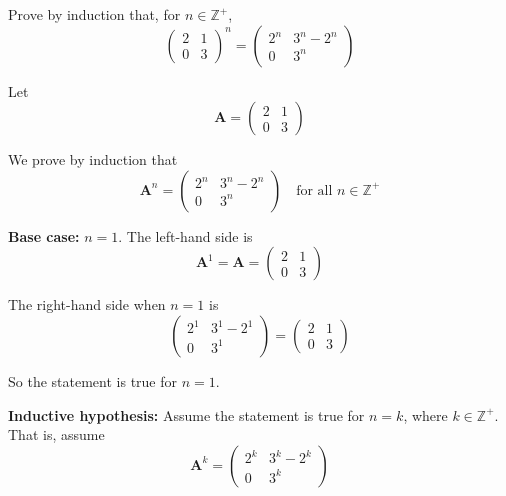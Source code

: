 \documentclass[leqno]{article}
\begin{document}
\djsFrontMatter
\begin{enumerate}[
  label=\textbf{\arabic*.},
  leftmargin=*,
  topsep=0pt,
  partopsep=0pt,
  parsep=0pt
]

\questionitem

Prove by induction that, for $n \in \mathbb{Z}^+$,
\[
\renewcommand{\arraystretch}{1.2}
\begin{pmatrix} 2 & 1 \\ 0 & 3 \end{pmatrix}^n = \begin{pmatrix} 2^n & 3^n - 2^n \\ 0 & 3^n \end{pmatrix}
\]

\vspace*{10pt}

\begin{djsSolution}
Let
\[
\mathbf{A}=\begin{pmatrix}2&1\\0&3\end{pmatrix}
\]

We prove by induction that
\[
\mathbf{A}^n=\begin{pmatrix}2^n&3^n-2^n\\0&3^n\end{pmatrix}\quad\text{for all }n\in\mathbb{Z}^+
\]

\textbf{Base case:} $n=1$. The left-hand side is
\[
\mathbf{A}^1=\mathbf{A}=\begin{pmatrix}2&1\\0&3\end{pmatrix}
\]

The right-hand side when $n=1$ is
\[
\begin{pmatrix}2^1&3^1-2^1\\0&3^1\end{pmatrix}
=
\begin{pmatrix}2&1\\0&3\end{pmatrix}
\]

So the statement is true for $n=1$.

\textbf{Inductive hypothesis:} Assume the statement is true for $n=k$, where $k\in\mathbb{Z}^+$. That is, assume
\[
\mathbf{A}^k=\begin{pmatrix}2^k&3^k-2^k\\0&3^k\end{pmatrix}
\]


\end{djsSolution}
\end{enumerate}
\end{document}
